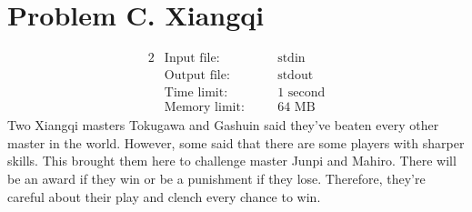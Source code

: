 \documentclass[12pt,a4paper]{article}
\begin{document}
\section*{\fontsize{18}{12}Problem C. Xiangqi}

\begin{alignat*} {2}
 &   \text{Input file:}   \quad     &&\text{stdin}\\
 &   \text{Output file:}  \quad     &&\text{stdout}\\
 &   \text{Time limit:}   \quad     &&\text{1 second}\\
 &   \text{Memory limit:} \quad     &&\text{64 MB}
\end{alignat*}
\noindent
Two Xiangqi masters Tokugawa and Gashuin said they've beaten every other master in the world. However, some said that there
are some players with sharper skills. This brought them here
to challenge master Junpi and Mahiro. There will be an award if they win or be a punishment if they lose.
Therefore, they're careful about their play and clench every chance to win.
\end{document}
